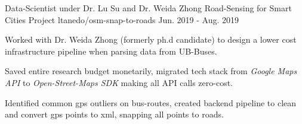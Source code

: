 \begin{cventries}
  \cventry
  { Data-Scientist under Dr. Lu Su and Dr. Weida Zhong} %
  { Road-Sensing for Smart Cities Project } %
  { ltanedo/osm-snap-to-roads } %
  { Jun. 2019 - Aug. 2019 } %
  {
    \begin{cvitems} %
      \item { Worked with Dr. Weida Zhong (formerly ph.d candidate) to design a lower cost infrastructure pipeline when parsing data from UB-Buses. }
      \item { Saved entire research budget monetarily, migrated tech stack from \textit{Google Maps API} to \textit{Open-Street-Maps SDK} making all API calls zero-cost.}
      \item { Identified common gps outliers on bus-routes, created backend pipeline to clean and convert gps points to xml, snapping all points to roads.}
    \end{cvitems}
  }


\end{cventries}
